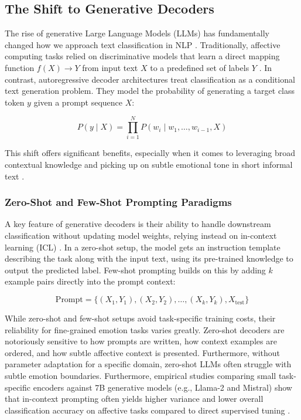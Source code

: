 \documentclass[conference]{IEEEtran}
\begin{document}
\subsection{The Shift to Generative Decoders}

The rise of generative Large Language Models (LLMs) has fundamentally changed how we approach text classification in NLP \cite{chakriswaran2019emotion}. 
Traditionally, affective computing tasks relied on discriminative models that learn a direct mapping function $f(X) \to Y$ 
from input text $X$ to a predefined set of labels $Y$ \cite{saravia2018carer}. In contrast, autoregressive decoder architectures treat classification 
as a conditional text generation problem. They model the probability of generating a target class token $y$ given a prompt sequence $X$:

\begin{equation}
    P(y \mid X) = \prod_{i=1}^{N} P(w_i \mid w_{1}, \dots, w_{i-1}, X)
\end{equation}

\noindent This shift offers significant benefits, especially when it comes to leveraging broad contextual knowledge and picking up on subtle 
emotional tone in short informal text \cite{kratzwald2018deep}.

\subsubsection{Zero-Shot and Few-Shot Prompting Paradigms}
A key feature of generative decoders is their ability to handle downstream classification without updating model weights, 
relying instead on in-context learning (ICL) \cite{cheng2026personality}. In a zero-shot setup, the model gets an instruction 
template describing the task along with the input text, using its pre-trained knowledge to output the predicted label. 
Few-shot prompting builds on this by adding $k$ example pairs directly into the prompt context:

\begin{equation}
    \text{Prompt} = \{ (X_1, Y_1), (X_2, Y_2), \dots, (X_k, Y_k), X_{\text{test}} \}
\end{equation}

While zero-shot and few-shot setups avoid task-specific training costs, their reliability for fine-grained emotion tasks varies greatly. 
Zero-shot decoders are notoriously sensitive to how prompts are written, how context examples are ordered, and how subtle affective 
context is presented. Furthermore, without parameter adaptation for a specific domain, zero-shot LLMs often struggle with subtle emotion boundaries.
Furthermore, empirical studies comparing small task-specific encoders against 7B generative models (e.g., Llama-2 and Mistral) show that in-context prompting often yields higher variance and lower overall classification accuracy on affective tasks compared to direct supervised tuning \cite{stigall2024large}.
\end{document}
